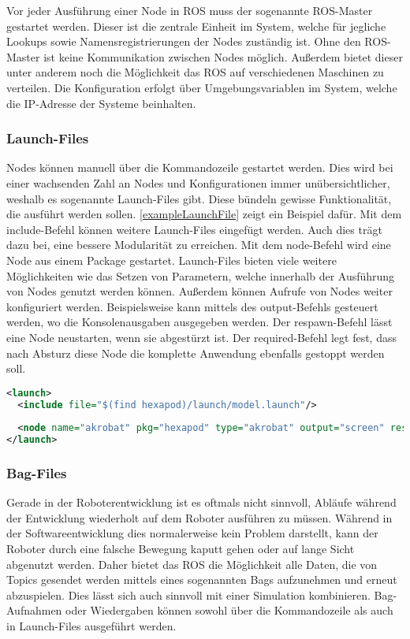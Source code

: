 Vor jeder Ausführung einer Node in \ac{ROS} muss der sogenannte \ac{ROS}-Master gestartet werden. Dieser ist die zentrale Einheit im System, welche für jegliche Lookups sowie Namensregistrierungen der Nodes zuständig ist. Ohne den \ac{ROS}-Master ist keine Kommunikation zwischen Nodes möglich. Außerdem bietet dieser unter anderem noch die Möglichkeit das \ac{ROS} auf verschiedenen Maschinen zu verteilen. Die Konfiguration erfolgt über Umgebungsvariablen im System, welche die IP-Adresse der Systeme beinhalten.

\subsubsection{Launch-Files}

Nodes können manuell über die Kommandozeile gestartet werden. Dies wird bei einer wachsenden Zahl an Nodes und Konfigurationen immer unübersichtlicher, weshalb es sogenannte Launch-Files gibt. Diese bündeln gewisse Funktionalität, die ausführt werden sollen. \autoref{exampleLaunchFile} zeigt ein Beispiel dafür. Mit dem include-Befehl können weitere Launch-Files eingefügt werden. Auch dies trägt dazu bei, eine bessere Modularität zu erreichen. Mit dem node-Befehl wird eine Node aus einem Package gestartet. Launch-Files bieten viele weitere Möglichkeiten wie das Setzen von Parametern, welche innerhalb der Ausführung von Nodes genutzt werden können. Außerdem können Aufrufe von Nodes weiter konfiguriert werden. Beispielsweise kann mittels des output-Befehls gesteuert werden, wo die Konsolenausgaben ausgegeben werden. Der respawn-Befehl lässt eine Node neustarten, wenn sie abgestürzt ist. Der required-Befehl legt fest, dass nach Absturz diese Node die komplette Anwendung ebenfalls gestoppt werden soll.

\begin{lstlisting}[label={exampleLaunchFile}, language=Xml, caption={Beispiel eines Launch-Files}]
<launch>
  <include file="$(find hexapod)/launch/model.launch"/>
  
  <node name="akrobat" pkg="hexapod" type="akrobat" output="screen" respawn="false" required="true"></node>
</launch>
\end{lstlisting}
  
\subsubsection{Bag-Files}

Gerade in der Roboterentwicklung ist es oftmals nicht sinnvoll, Abläufe während der Entwicklung wiederholt auf dem Roboter ausführen zu müssen. Während in der Softwareentwicklung dies normalerweise kein Problem darstellt, kann der Roboter durch eine falsche Bewegung kaputt gehen oder auf lange Sicht abgenutzt werden. Daher bietet das \ac{ROS} die Möglichkeit alle Daten, die von Topics gesendet werden mittels eines sogenannten Bags aufzunehmen und erneut abzuspielen. Dies lässt sich auch sinnvoll mit einer Simulation kombinieren. Bag-Aufnahmen oder Wiedergaben können sowohl über die Kommandozeile als auch in Launch-Files ausgeführt werden.

